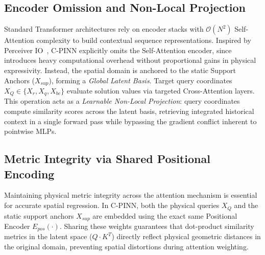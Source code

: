 \subsection{Encoder Omission and Non-Local Projection}
Standard Transformer architectures rely on encoder stacks with $\mathcal{O}(N^2)$ Self-Attention complexity to build contextual sequence representations. Inspired by Perceiver IO~\cite{jaegle2021perceiverio}, C-PINN explicitly omits the Self-Attention encoder, since introduces heavy computational overhead without proportional gains in physical expressivity. Instead, the spatial domain is anchored to the static Support Anchors ($X_{sup}$), forming a \emph{Global Latent Basis}. Target query coordinates $X_Q \in \{X_r, X_q, X_{bc}\}$ evaluate solution values via targeted Cross-Attention layers. This operation acts as a \emph{Learnable Non-Local Projection}: query coordinates compute similarity scores across the latent basis, retrieving integrated historical context in a single forward pass while bypassing the gradient conflict inherent to pointwise MLPs.

\subsection{Metric Integrity via Shared Positional Encoding}
Maintaining physical metric integrity across the attention mechanism is essential for accurate spatial regression. In C-PINN, both the physical queries $X_Q$ and the static support anchors $X_{sup}$ are embedded using the exact same Positional Encoder $E_{pos}(\cdot)$. Sharing these weights guarantees that dot-product similarity metrics in the latent space ($Q \cdot K^T$) directly reflect physical geometric distances in the original domain, preventing spatial distortions during attention weighting.
